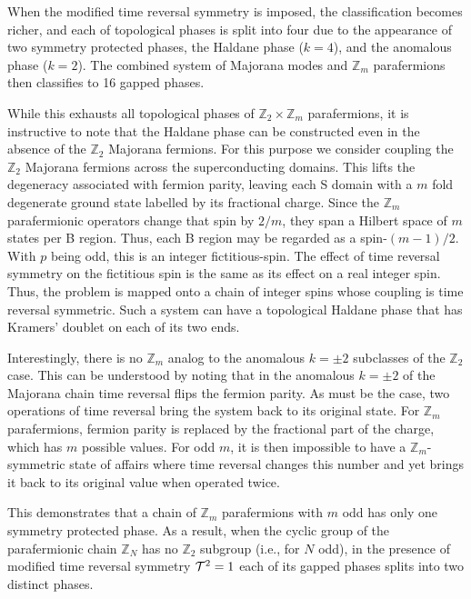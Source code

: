 \documentclass[twocolumn,aps,prb,showpacs]{revtex4-1}
\begin{document}
When the modified time reversal symmetry is imposed, the classification becomes richer, and  each of  topological phases is split into four due to the appearance of two symmetry protected phases, the Haldane phase ($k=4$), and the anomalous phase ($k=2$). The combined system of Majorana modes and $ \mathbb{Z}_m$ parafermions then classifies to  16 gapped phases.

While this exhausts all topological phases of $\mathbb{Z}_{2}\times \mathbb{Z}_{m}$ parafermions, it is instructive to note that the Haldane phase can be constructed even in the absence of the $ \mathbb{Z}_2$ Majorana fermions. For this purpose we consider coupling the $ \mathbb{Z}_2$ Majorana fermions across the superconducting domains. This lifts the degeneracy associated with fermion parity, leaving each S domain with a $m$ fold degenerate ground state labelled by its fractional charge.
Since the $ \mathbb{Z}_m$ parafermionic operators change that spin by $2/m$, they span a Hilbert space of $m$ states per B region. Thus, each B region may be regarded as a spin-$(m-1)/2$. With $p$ being odd, this is an integer fictitious-spin. The effect of time reversal symmetry on the fictitious spin is the same as its effect on a real integer spin. Thus, the problem is mapped onto a chain of integer spins whose coupling is time reversal symmetric. Such a system can have a topological Haldane phase that  has Kramers' doublet on each of its two ends.

Interestingly, there is no $\mathbb{Z}_m$ analog to the anomalous $k=\pm 2$ subclasses of the $\mathbb{Z}_2$ case. This can be understood by noting that in the anomalous $k=\pm 2$ of the Majorana chain time reversal flips the fermion parity. As must be the case, two operations of time reversal bring the system back to its original state. For $\mathbb{Z}_m$ parafermions, fermion parity is replaced by the fractional part of the charge, which has $m$ possible values. For odd $m$, it is then impossible to have a $\mathbb{Z}_m$-symmetric state of affairs where time reversal changes this number and yet brings it back to its original value when operated twice.

This demonstrates that a chain of  $\mathbb{Z}_m$ parafermions with $m$ odd has only one symmetry protected phase. As a result, when the cyclic group of the parafermionic chain $ \mathbb{Z}_N$ has no $ \mathbb{Z}_2$ subgroup (i.e., for $ N$ odd), in the presence of modified time reversal symmetry  ${\cal T}^2=1 $ each of its gapped phases splits into two distinct phases.
\end{document}
